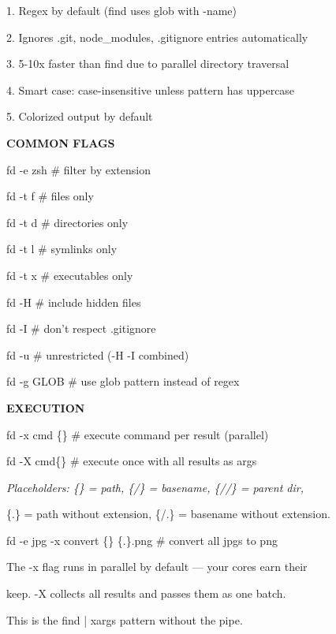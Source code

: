 \documentclass[11pt,a4paper,twoside]{book}
\begin{document}
1. Regex by default (find uses glob with -name)

2. Ignores .git, node\_modules, .gitignore entries automatically

3. 5-10x faster than find due to parallel directory traversal

4. Smart case: case-insensitive unless pattern has uppercase

5. Colorized output by default


\vspace{12pt}
{\bfseries\color{neonyellow} COMMON FLAGS}\vspace{4pt}

fd -e zsh           \# filter by extension

fd -t f             \# files only

fd -t d             \# directories only

fd -t l             \# symlinks only

fd -t x             \# executables only

fd -H               \# include hidden files

fd -I               \# don't respect .gitignore

fd -u               \# unrestricted (-H -I combined)

fd -g GLOB          \# use glob pattern instead of regex


\vspace{12pt}
{\bfseries\color{neonyellow} EXECUTION}\vspace{4pt}

fd -x cmd \{\}        \# execute command per result (parallel)

fd -X cmd\{\}         \# execute once with all results as args

{\small\itshape\color{dimtext} Placeholders: \{\} = path, \{/\} = basename, \{//\} = parent dir,}

\{.\} = path without extension, \{/.\} = basename without extension.

\begin{codebox}
fd -e jpg -x convert \{\} \{.\}.png  \# convert all jpgs to png\\
\end{codebox}

The -x flag runs in parallel by default — your cores earn their

keep. -X collects all results and passes them as one batch.

This is the find | xargs pattern without the pipe.
\end{document}
